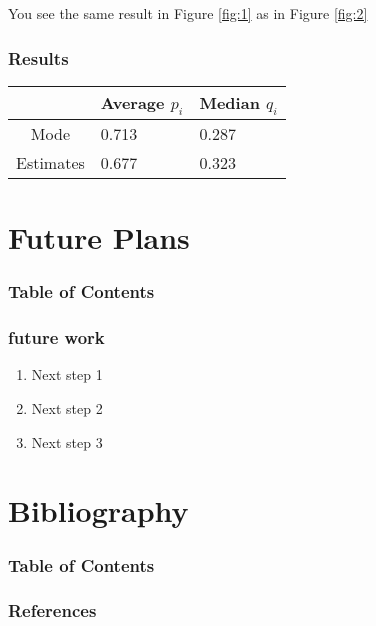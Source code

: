 \documentclass{beamer}
\begin{document}
  \begin{frame}
    You see the same result in Figure \ref{fig:1} as in Figure \ref{fig:2}
  \end{frame}


  \begin{frame}
    \frametitle{Results}
    \begin{table}
      \centering
      \begin{tabular}{||c|L|L||}
        \hline
        & Average \(p_{i}\) &
        Median \(q_{i}\)\\ [0.5ex]
        \hline\hline
        Mode & 0.713 & 0.287 \\
        Estimates & 0.677 & 0.323 \\
        \hline
      \end{tabular}
      \label{tab:2}
    \end{table}
  \end{frame}


\section{Future Plans}

  \begin{frame}
    \frametitle{Table of Contents}
    \tableofcontents[currentsection]
  \end{frame}


  \begin{frame}
    \frametitle{future work}

    \begin{enumerate}
      \item<3-> Next step 1
      \item<2-> Next step 2
      \item<1-> Next step 3
    \end{enumerate}

  \end{frame}


\section{Bibliography}
\begin{frame}
  \frametitle{Table of Contents}
  \tableofcontents[currentsection]
\end{frame}

\begin{frame}[allowframebreaks]
  \frametitle{References}

  \printbibliography

\end{frame}
\end{document}
